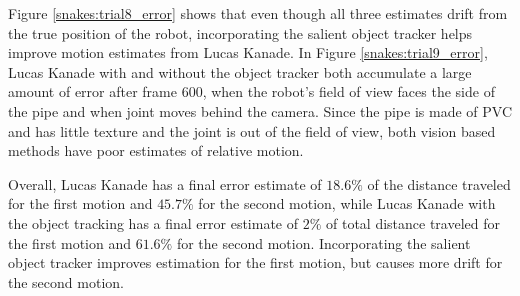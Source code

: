 \documentclass[letterpaper, 10 pt, conference]{ieeeconf}
\begin{document}
Figure \ref{snakes:trial8_error} shows that even though all three estimates drift from the true position of the robot, incorporating the salient object tracker helps improve motion estimates from Lucas Kanade. In Figure \ref{snakes:trial9_error}, Lucas Kanade with and without the object tracker both accumulate a large amount of error after frame 600, when the robot's field of view faces the side of the pipe and when joint moves behind the camera. Since the pipe is made of PVC and has little texture and the joint is out of the field of view, both vision based methods have poor estimates of relative motion.

Overall, Lucas Kanade has a final error estimate of $18.6 \%$ of the distance traveled for the first motion and $45.7 \%$ for the second motion, while Lucas Kanade with the object tracking has a final error estimate of $2 \%$ of total distance traveled for the first motion and $61.6 \%$ for the second motion. Incorporating the salient object tracker improves estimation for the first motion, but causes more drift for the second motion.
\end{document}
